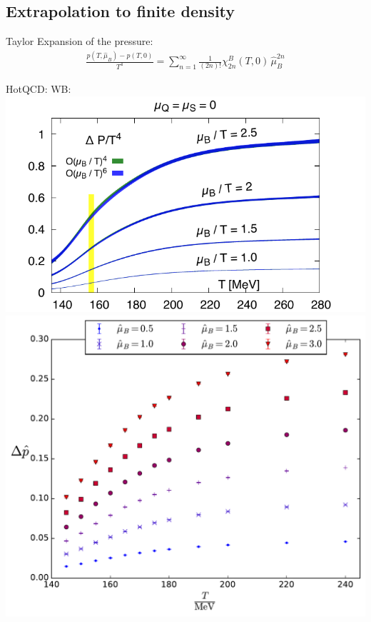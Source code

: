 \subsection{Extrapolation to finite density}

\begin{frame}[fragile]
    \vspace{-0.2cm}
    \begin{block}{Taylor Expansion of the pressure:}
        \begin{align}
            \frac{p(T,\hat{\mu}_B)-p(T,0)}{T^4}=\sum^{\infty}_{n=1}\frac{1}{(2n)!}\chi^B_{2n}(T,0)\,\hat{\mu}_B^{2n}
        \end{align}
    \end{block}
    HotQCD: \hspace{7cm}WB:
    \vspace{0.5cm}
    \includegraphics[width=0.5\linewidth,trim={0 0 0 0.6cm}, clip]{Images/Figures/Temp_BQS000_muB_Order_test.pdf}\hspace{1cm}\includegraphics[width=0.4\linewidth,trim={0 1.3cm 0 0}, clip]{Images/Figures/plot6.pdf}

\end{frame}
